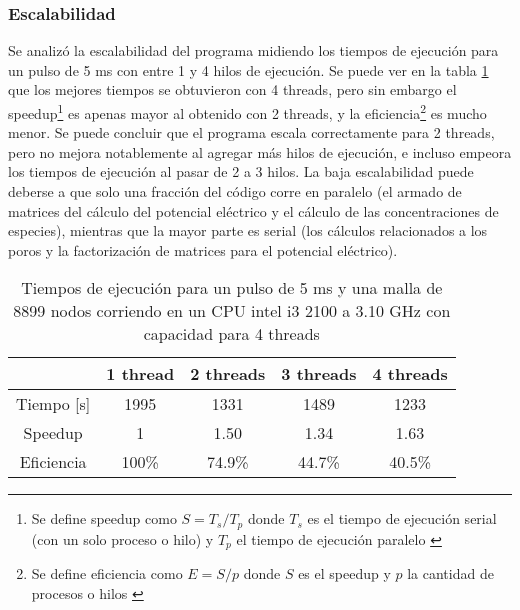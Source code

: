 \clearpage

\subsubsection*{Escalabilidad}

Se analizó la escalabilidad del programa midiendo los tiempos de ejecución para un pulso de 5 \si{\milli\second} con entre 1 y 4 hilos de ejecución. Se puede ver en la tabla \ref{tab:escala} que los mejores tiempos se obtuvieron con 4 threads, pero sin embargo el speedup\footnote{Se define speedup como $S = T_s / T_p$ donde $T_s$ es el tiempo de ejecución serial (con un solo proceso o hilo) y $T_p$ el tiempo de ejecución paralelo \cite{pacheco}} es apenas mayor al obtenido con 2 threads, y la eficiencia\footnote{Se define eficiencia como $E = S / p$ donde $S$ es el speedup y $p$ la cantidad de procesos o hilos \cite{pacheco}} es mucho menor. Se puede concluir que el programa escala correctamente para 2 threads, pero no mejora notablemente al agregar más hilos de ejecución, e incluso empeora los tiempos de ejecución al pasar de 2 a 3 hilos. La baja escalabilidad puede deberse a que solo una fracción del código corre en paralelo (el armado de matrices del cálculo del potencial eléctrico y el cálculo de las concentraciones de especies), mientras que la mayor parte es serial (los cálculos relacionados a los poros y la factorización de matrices para el potencial eléctrico).

\begin{table}[h!]
    \centering
	\begin{tabular}{ c | c c c c }              
		& 1 thread & 2 threads & 3 threads & 4 threads \\
		\hline
		Tiempo [\si{\second}] & 1995 & 1331 & 1489 & 1233 \\
		Speedup & 1 & 1.50 & 1.34 & 1.63 \\
		Eficiencia & 100\% & 74.9\% & 44.7\% & 40.5\% \\
	\end{tabular}
    \caption{Tiempos de ejecución para un pulso de 5 \si{\milli\second} y una malla de 8899 nodos corriendo en un CPU intel i3 2100 a 3.10 GHz con capacidad para 4 threads}
    \label{tab:escala}
\end{table}
